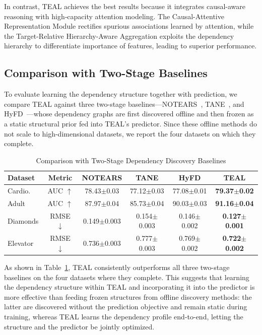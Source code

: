 \documentclass[conference]{IEEEtran}
\newcommand{\icde}[1]{{\color{black}#1}}
\newcommand{\sydesi}[1]{{\color{black}#1}}
\newcommand{\syic}[1]{{\color{black}#1}}
\newcommand{\syone}[1]{{\color{black}#1}}
\newcommand*{\ourmodel}{TEAL}
\begin{document}
{\icde{
In contrast, \ourmodel{} achieves the best results because it integrates \syic{causal-aware} reasoning with high‑capacity attention modeling.}
The Causal-Attentive Representation Module rectifies spurious associations learned by attention, while the \syic{Target-Relative Hierarchy-Aware Aggregation} exploits the \syic{dependency} hierarchy to \sydesi{differentiate importance of features}, leading to superior performance.
}

\subsection{\syic{Comparison with Two-Stage Baselines}}\label{sec:two_stage}

\syic{To evaluate learning the dependency structure together with prediction, we compare \ourmodel{} against three two-stage baselines---NOTEARS~\cite{notears}, TANE~\cite{r:tane}, and HyFD~\cite{r:hyfd}---whose dependency graphs are first discovered offline and then frozen as a static structural prior fed into \ourmodel{}'s predictor. 
Since these offline methods do not scale to high-dimensional datasets, we report the four datasets on which they complete.
}

\begin{table}[h]
    \caption{\syic{Comparison with Two-Stage Dependency Discovery Baselines}}
    \label{tab:two_stage}
    \centering
    \footnotesize
    \setlength{\tabcolsep}{1.7pt}
    \begin{tabular}{l c c c c c}
        \toprule
        Dataset & Metric & NOTEARS & TANE & HyFD & \ourmodel{} \\
        \midrule
        Cardio. & AUC $\uparrow$ & 78.43$\pm$0.03 & 77.12$\pm$0.03 & 77.08$\pm$0.01 & \textbf{79.37$\pm$0.02} \\
        Adult & AUC $\uparrow$ & 87.97$\pm$0.04 & 85.73$\pm$0.04 & 90.03$\pm$0.03 & \textbf{91.16$\pm$0.04} \\
        Diamonds & RMSE $\downarrow$ & 0.149$\pm$0.003 & 0.154$\pm$0.003 & 0.146$\pm$0.002 & \textbf{0.127$\pm$0.001} \\
        Elevator & RMSE $\downarrow$ & 0.736$\pm$0.003 & 0.777$\pm$0.003 & 0.769$\pm$0.002 & \textbf{0.722$\pm$0.002} \\
        \bottomrule
    \end{tabular}
\end{table}

\syic{As shown in Table~\ref{tab:two_stage}, \ourmodel{} consistently outperforms all three two-stage baselines on the four datasets where they complete. This suggests that learning the dependency structure within \ourmodel{} and incorporating it into the predictor is more effective than feeding frozen structures from offline discovery methods: the latter are discovered without the prediction objective and remain static during training, whereas \ourmodel{} learns the dependency profile end-to-end, letting the structure and the predictor be \syone{jointly optimized}.}
\end{document}
